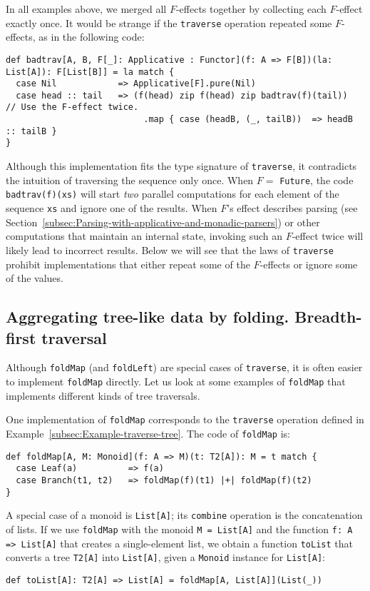 In all examples above, we merged all $F$-effects together by collecting
each $F$-effect exactly once. It would be strange if the \lstinline!traverse!
operation repeated some $F$-effects, as in the following code:
\begin{lstlisting}
def badtrav[A, B, F[_]: Applicative : Functor](f: A => F[B])(la: List[A]): F[List[B]] = la match {
  case Nil            => Applicative[F].pure(Nil)
  case head :: tail   => (f(head) zip f(head) zip badtrav(f)(tail))     // Use the F-effect twice.
                           .map { case (headB, (_, tailB))  => headB :: tailB }
}
\end{lstlisting}
Although this implementation fits the type signature of \lstinline!traverse!,
it contradicts the intuition of traversing the sequence only once.
When $F=$ \lstinline!Future!, the code \lstinline!badtrav(f)(xs)!
will start \emph{two} parallel computations for each element of the
sequence \lstinline!xs! and ignore one of the results. When $F$\textsf{'}s
effect describes parsing (see Section~\ref{subsec:Parsing-with-applicative-and-monadic-parsers})
or other computations that maintain an internal state, invoking such
an $F$-effect twice will likely lead to incorrect results. Below
we will see that the laws of \lstinline!traverse! prohibit implementations
that either repeat some of the $F$-effects or ignore some of the
values.

\subsection{Aggregating tree-like data by folding. Breadth-first traversal\label{subsec:Aggregating-tree-like-data-bfs}}

Although \lstinline!foldMap! (and \lstinline!foldLeft!) are special
cases of \lstinline!traverse!, it is often easier to implement \lstinline!foldMap!
directly. Let us look at some examples of \lstinline!foldMap! that
implements different kinds of tree traversals.

One implementation of \lstinline!foldMap! corresponds to the \lstinline!traverse!
operation defined in Example~\ref{subsec:Example-traverse-tree}.
The code of \lstinline!foldMap! is:
\begin{lstlisting}
def foldMap[A, M: Monoid](f: A => M)(t: T2[A]): M = t match {
  case Leaf(a)          => f(a)
  case Branch(t1, t2)   => foldMap(f)(t1) |+| foldMap(f)(t2)
}
\end{lstlisting}

A special case of a monoid is \lstinline!List[A]!; its \lstinline!combine!
operation is the concatenation of lists. If we use \lstinline!foldMap!
with the monoid \lstinline!M = List[A]! and the function \lstinline!f: A => List[A]!
that creates a single-element list, we obtain a function \lstinline!toList!
that converts a tree \lstinline!T2[A]! into \lstinline!List[A]!,
given a \lstinline!Monoid! instance for \lstinline!List[A]!:
\begin{lstlisting}
def toList[A]: T2[A] => List[A] = foldMap[A, List[A]](List(_))
\end{lstlisting}

